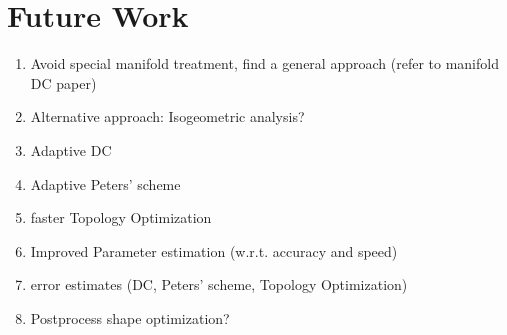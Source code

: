 \section{Future Work}
\label{sec:Future}
\begin{enumerate}
\item Avoid special manifold treatment, find a general approach (refer to manifold DC paper)
\item Alternative approach: Isogeometric analysis?
\item Adaptive DC
\item Adaptive Peters' scheme
\item faster Topology Optimization
\item Improved Parameter estimation (w.r.t. accuracy and speed)
\item error estimates (DC, Peters' scheme, Topology Optimization)
\item Postprocess shape optimization?
\end{enumerate}
